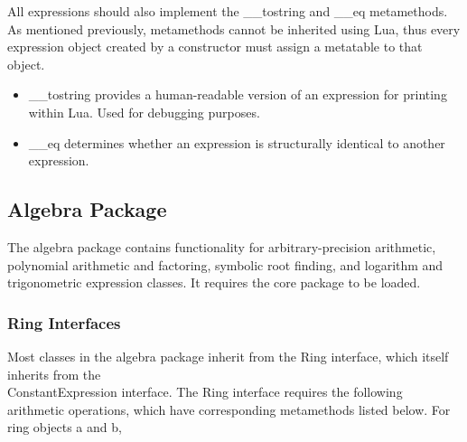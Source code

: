 \documentclass{article}
\begin{document}
All expressions should also implement the {\ttfamily \_\_tostring} and {\ttfamily \_\_eq} metamethods. As mentioned previously, metamethods cannot be inherited using Lua, thus every expression object created by a constructor must assign a metatable to that object.

\begin{itemize}
    \item {\ttfamily \_\_tostring} provides a human-readable version of an expression for printing within Lua. Used for debugging purposes.
    
    \item {\ttfamily \_\_eq} determines whether an expression is structurally identical to another expression.
\end{itemize}

\subsection{Algebra Package}

The algebra package contains functionality for arbitrary-precision arithmetic, polynomial arithmetic and factoring, symbolic root finding, and logarithm and trigonometric expression classes. It requires the core package to be loaded.

\subsubsection{Ring Interfaces}

Most classes in the algebra package inherit from the {\ttfamily Ring} interface, which itself inherits from the \\ {\ttfamily ConstantExpression} interface. The {\ttfamily Ring} interface requires the following arithmetic operations, which have corresponding metamethods listed below. For ring objects {\ttfamily a} and {\ttfamily b},
\end{document}
